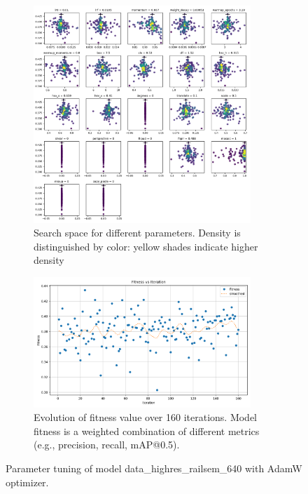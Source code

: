 \documentclass[Master,MDS,english]{BASE/twbook} %
\begin{document}
\begin{figure}
\centering
\begin{subfigure}{.5\textwidth}
  \centering
  \includegraphics[width=0.9\textwidth]{images/yolo/highres/adam/tune_scatter_plots}
  \caption{Search space for different parameters. Density is distinguished by color: yellow shades indicate higher density}
\end{subfigure}%
\begin{subfigure}{.5\textwidth}
  \centering
  \includegraphics[width=0.9\textwidth]{images/yolo/highres/adam/tune_fitness}
  \caption{Evolution of fitness value over 160 iterations. Model fitness is a weighted combination of different metrics (e.g., precision, recall, mAP@0.5).}
  \label{fig:images_from_videos}
\end{subfigure}
\caption{Parameter tuning of model data\_highres\_railsem\_640 with AdamW optimizer.}
\label{fig:yolo_tune_highres_adam}
\end{figure}
\end{document}
